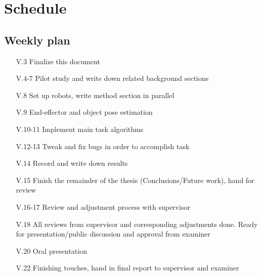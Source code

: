 \section{Schedule}
\subsection{Weekly plan}
\begin{itemize}
    \item[V.3] Finalize this document
    \item[V.4-7] Pilot study and write down related background sections
    \item[V.8] Set up robots, write method section in parallel
    \item[V.9] End-effector and object pose estimation
    \item[V.10-11] Implement main task algorithms
    \item[V.12-13] Tweak and fix bugs in order to accomplish task
    \item[V.14] Record and write down results
    \item[V.15] Finish the remainder of the thesis (Conclusions/Future work), hand for review
    \item[V.16-17] Review and adjustment process with supervisor
    \item[V.18] All reviews from supervisor and corresponding adjustments done. Ready
                for presentation/public discussion and approval from examiner
    \item[V.20] Oral presentation
    \item[V.22] Finishing touches, hand in final report to supervisor and examiner
\end{itemize}
